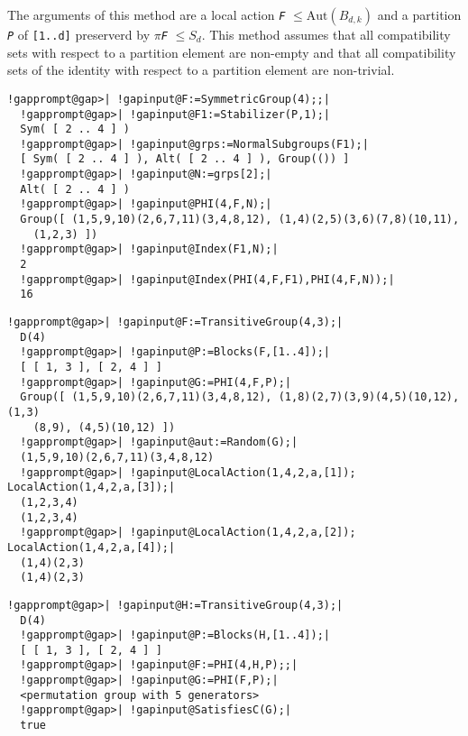 \documentclass[a4paper,11pt]{report}
\begin{document}
{{{\begin{description}
 The arguments of this method are a local action \mbox{\texttt{\mdseries\slshape F}} $\le\mathrm{Aut}(B_{d,k})$ and a partition \mbox{\texttt{\mdseries\slshape P}} of \texttt{[1..d]} preserverd by $\pi$\mbox{\texttt{\mdseries\slshape F}} $\le S_{d}$. This method assumes that all compatibility sets with respect to a partition
element are non-empty and that all compatibility sets of the identity with
respect to a partition element are non-trivial. 
\end{description}
 

 }

 

 
\begin{Verbatim}[commandchars=!@|,fontsize=\small,frame=single,label=Example]
  !gapprompt@gap>| !gapinput@F:=SymmetricGroup(4);;|
  !gapprompt@gap>| !gapinput@F1:=Stabilizer(P,1);|
  Sym( [ 2 .. 4 ] )
  !gapprompt@gap>| !gapinput@grps:=NormalSubgroups(F1);|
  [ Sym( [ 2 .. 4 ] ), Alt( [ 2 .. 4 ] ), Group(()) ]
  !gapprompt@gap>| !gapinput@N:=grps[2];|
  Alt( [ 2 .. 4 ] )
  !gapprompt@gap>| !gapinput@PHI(4,F,N);|
  Group([ (1,5,9,10)(2,6,7,11)(3,4,8,12), (1,4)(2,5)(3,6)(7,8)(10,11), 
    (1,2,3) ])
  !gapprompt@gap>| !gapinput@Index(F1,N);|
  2
  !gapprompt@gap>| !gapinput@Index(PHI(4,F,F1),PHI(4,F,N));|
  16
\end{Verbatim}
 

 
\begin{Verbatim}[commandchars=!@|,fontsize=\small,frame=single,label=Example]
  !gapprompt@gap>| !gapinput@F:=TransitiveGroup(4,3);|
  D(4)
  !gapprompt@gap>| !gapinput@P:=Blocks(F,[1..4]);|
  [ [ 1, 3 ], [ 2, 4 ] ]
  !gapprompt@gap>| !gapinput@G:=PHI(4,F,P);|
  Group([ (1,5,9,10)(2,6,7,11)(3,4,8,12), (1,8)(2,7)(3,9)(4,5)(10,12), (1,3)
    (8,9), (4,5)(10,12) ])
  !gapprompt@gap>| !gapinput@aut:=Random(G);|
  (1,5,9,10)(2,6,7,11)(3,4,8,12)
  !gapprompt@gap>| !gapinput@LocalAction(1,4,2,a,[1]); LocalAction(1,4,2,a,[3]);|
  (1,2,3,4)
  (1,2,3,4)
  !gapprompt@gap>| !gapinput@LocalAction(1,4,2,a,[2]); LocalAction(1,4,2,a,[4]);|
  (1,4)(2,3)
  (1,4)(2,3)
\end{Verbatim}
 

 
\begin{Verbatim}[commandchars=!@|,fontsize=\small,frame=single,label=Example]
  !gapprompt@gap>| !gapinput@H:=TransitiveGroup(4,3);|
  D(4)
  !gapprompt@gap>| !gapinput@P:=Blocks(H,[1..4]);|
  [ [ 1, 3 ], [ 2, 4 ] ]
  !gapprompt@gap>| !gapinput@F:=PHI(4,H,P);;|
  !gapprompt@gap>| !gapinput@G:=PHI(F,P);|
  <permutation group with 5 generators>
  !gapprompt@gap>| !gapinput@SatisfiesC(G);|
  true
\end{Verbatim}
 

}}
\end{document}
